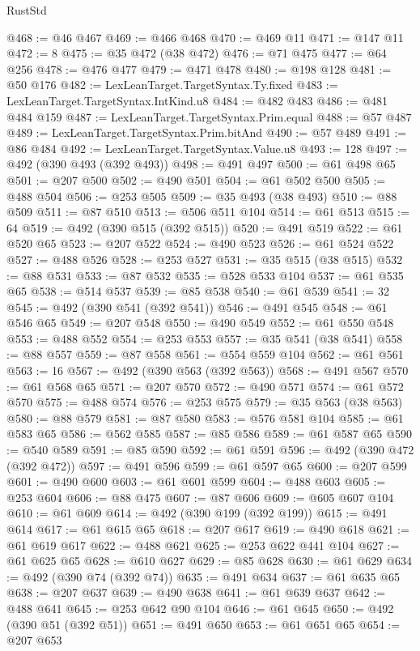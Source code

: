 \begin{lexlean}{RustStd}
\begin{coremodule}
@468 := @46 @467
@469 := @466 @468
@470 := @469 @11
@471 := @147 @11
@472 := 8
@475 := @35 @472 (@38 @472)
@476 := @71 @475
@477 := @64 @256
@478 := @476 @477
@479 := @471 @478
@480 := @198 @128
@481 := @50 @176
@482 := LexLeanTarget.TargetSyntax.Ty.fixed
@483 := LexLeanTarget.TargetSyntax.IntKind.u8
@484 := @482 @483
@486 := @481 @484 @159
@487 := LexLeanTarget.TargetSyntax.Prim.equal
@488 := @57 @487
@489 := LexLeanTarget.TargetSyntax.Prim.bitAnd
@490 := @57 @489
@491 := @86 @484
@492 := LexLeanTarget.TargetSyntax.Value.u8
@493 := 128
@497 := @492 (@390 @493 (@392 @493))
@498 := @491 @497
@500 := @61 @498 @65
@501 := @207 @500
@502 := @490 @501
@504 := @61 @502 @500
@505 := @488 @504
@506 := @253 @505
@509 := @35 @493 (@38 @493)
@510 := @88 @509
@511 := @87 @510
@513 := @506 @511 @104
@514 := @61 @513
@515 := 64
@519 := @492 (@390 @515 (@392 @515))
@520 := @491 @519
@522 := @61 @520 @65
@523 := @207 @522
@524 := @490 @523
@526 := @61 @524 @522
@527 := @488 @526
@528 := @253 @527
@531 := @35 @515 (@38 @515)
@532 := @88 @531
@533 := @87 @532
@535 := @528 @533 @104
@537 := @61 @535 @65
@538 := @514 @537
@539 := @85 @538
@540 := @61 @539
@541 := 32
@545 := @492 (@390 @541 (@392 @541))
@546 := @491 @545
@548 := @61 @546 @65
@549 := @207 @548
@550 := @490 @549
@552 := @61 @550 @548
@553 := @488 @552
@554 := @253 @553
@557 := @35 @541 (@38 @541)
@558 := @88 @557
@559 := @87 @558
@561 := @554 @559 @104
@562 := @61 @561
@563 := 16
@567 := @492 (@390 @563 (@392 @563))
@568 := @491 @567
@570 := @61 @568 @65
@571 := @207 @570
@572 := @490 @571
@574 := @61 @572 @570
@575 := @488 @574
@576 := @253 @575
@579 := @35 @563 (@38 @563)
@580 := @88 @579
@581 := @87 @580
@583 := @576 @581 @104
@585 := @61 @583 @65
@586 := @562 @585
@587 := @85 @586
@589 := @61 @587 @65
@590 := @540 @589
@591 := @85 @590
@592 := @61 @591
@596 := @492 (@390 @472 (@392 @472))
@597 := @491 @596
@599 := @61 @597 @65
@600 := @207 @599
@601 := @490 @600
@603 := @61 @601 @599
@604 := @488 @603
@605 := @253 @604
@606 := @88 @475
@607 := @87 @606
@609 := @605 @607 @104
@610 := @61 @609
@614 := @492 (@390 @199 (@392 @199))
@615 := @491 @614
@617 := @61 @615 @65
@618 := @207 @617
@619 := @490 @618
@621 := @61 @619 @617
@622 := @488 @621
@625 := @253 @622 @441 @104
@627 := @61 @625 @65
@628 := @610 @627
@629 := @85 @628
@630 := @61 @629
@634 := @492 (@390 @74 (@392 @74))
@635 := @491 @634
@637 := @61 @635 @65
@638 := @207 @637
@639 := @490 @638
@641 := @61 @639 @637
@642 := @488 @641
@645 := @253 @642 @90 @104
@646 := @61 @645
@650 := @492 (@390 @51 (@392 @51))
@651 := @491 @650
@653 := @61 @651 @65
@654 := @207 @653

\end{coremodule}
\end{lexlean}
